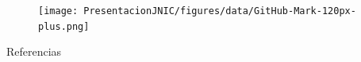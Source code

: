 \documentclass[aspectratio=169]{beamer}
\begin{document}
\appendix

\begin{frame}{}

\vspace{3cm}
\qquad\Huge{}
\vspace{1cm}
\hspace{2cm}
\small{\begin{figure}[b]
\texttt{[image: PresentacionJNIC/figures/data/GitHub-Mark-120px-plus.png]}~
\href{https://github.com/b0rh/HOUSE}{\color{blue}{https://github.com/b0rh/HOUSE}}
\end{figure}}

\end{frame}

\begin{frame}[allowframebreaks]{Referencias }

    
    
\end{frame}
\end{document}
